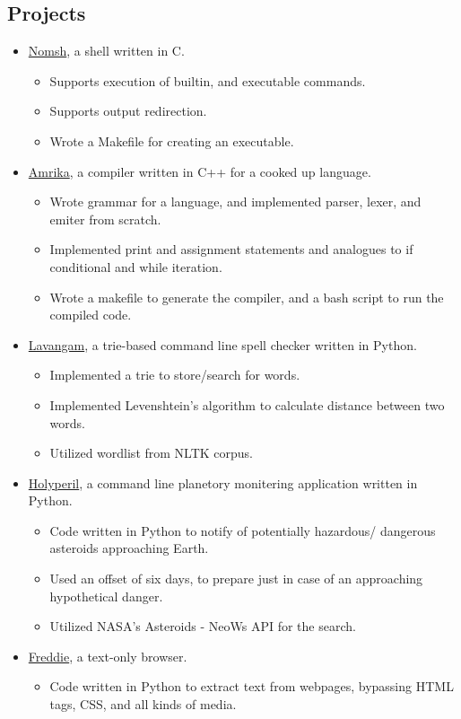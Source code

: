 \documentclass{article}
\begin{document}
\begin{multicols}{2}
\section*{Projects}
\begin{itemize}
\item \href{https://github.com/rcreddyn/nomsh}{Nomsh}, a shell written in C.
\begin{itemize}
\item Supports execution of builtin, and executable commands.
\item Supports output redirection.
\item Wrote a Makefile for creating an executable.
\end{itemize}
\item  \href{https://github.com/rcreddyn/nomsh}{Amrika}, a compiler written in C++ for a cooked up language.
\begin{itemize}
\item Wrote grammar for a language, and implemented parser, lexer, and emiter from scratch.
\item Implemented print and assignment statements and analogues to if conditional and while iteration.
\item Wrote a makefile to generate the compiler, and a bash script to run the compiled code.
\end{itemize}
\item \href{https://github.com/rcreddyn/nomsh}{Lavangam}, a trie-based command line spell checker written in Python.
\begin{itemize}
\item Implemented a trie to store/search for words.
\item Implemented Levenshtein's algorithm to calculate distance between two words.
\item Utilized wordlist from NLTK corpus.
\end{itemize}
\item \href{https://github.com/rcreddyn/nomsh}{Holyperil}, a command line planetory monitering application written in Python. 
\begin{itemize}
\item Code written in Python to notify of potentially hazardous/ dangerous asteroids approaching Earth.
\item Used an offset of six days, to prepare just in case of an approaching hypothetical danger.
\item Utilized NASA's Asteroids - NeoWs API for the search.
\end{itemize}
\item \href{https://github.com/rcreddyn/nomsh}{Freddie}, a text-only browser.
\begin{itemize}
\item Code written in Python to extract text from webpages, bypassing HTML tags, CSS, and all kinds of media.
\end{itemize}
\end{itemize} 
\end{multicols}
\end{document}
